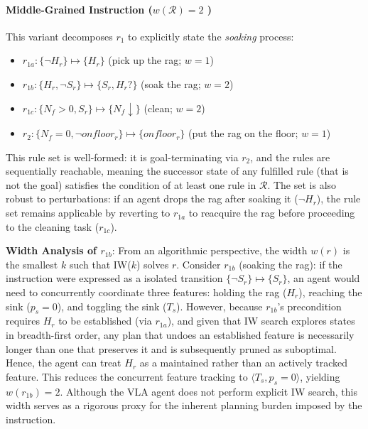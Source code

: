\documentclass{article}
\begin{document}
\paragraph{Middle-Grained Instruction ($w(\mathcal R) = 2$ )} This variant decomposes $r_1$ to explicitly state the \emph{soaking} process:
\begin{itemize}
    \item $r_{1a} : \{\neg H_r\} \mapsto \{H_r\}$ (pick up the rag; $w = 1$)
    \item $r_{1b} : \{H_r, \neg S_r \} \mapsto \{S_r, H_r?\}$ (soak the rag; $w = 2$)
    \item $r_{1c} : \{N_f > 0, S_r \} \mapsto \{N_f \downarrow\}$ (clean; $w = 2$)
    \item $r_2 : \{N_f = 0, \neg onfloor_{r}\} \mapsto \{onfloor_{r}\}$ (put the rag on the floor; $w = 1$)
\end{itemize}
This rule set is well-formed: it is goal-terminating via $r_2$, and the rules are sequentially reachable, meaning the successor state of any fulfilled rule (that is not the goal) satisfies the condition of at least one rule in $\mathcal{R}$. The set is also robust to perturbations: if an agent drops the rag after soaking it ($\neg H_r$), the rule set remains applicable by reverting to $r_{1a}$ to reacquire the rag before proceeding to the cleaning task ($r_{1c}$). 

\noindent \textbf{Width Analysis of $r_{1b}$}: From an algorithmic perspective, the width $w(r)$ is the smallest $k$ such that IW($k$) solves $r$. Consider $r_{1b}$ (soaking the rag): if the instruction were expressed as a isolated transition $\{\neg S_r\} \mapsto \{S_r\}$, an agent would need to concurrently coordinate three features: holding the rag ($H_r$), reaching the sink ($p_s = 0$), and toggling the sink ($T_s$). However, because $r_{1b}$'s precondition requires $H_r$ to be established (via $r_{1a}$), and given that IW search explores states in breadth-first order, any plan that undoes an established feature is necessarily longer than one that preserves it and is subsequently pruned as suboptimal. Hence, the agent can treat $H_r$ as a maintained rather than an actively tracked feature. This reduces the concurrent feature tracking to $\langle T_s, p_s = 0 \rangle$, yielding $w(r_{1b})= 2$. Although the VLA agent does not perform explicit IW search, this width serves as a rigorous proxy for the inherent planning burden imposed by the instruction.
\end{document}

